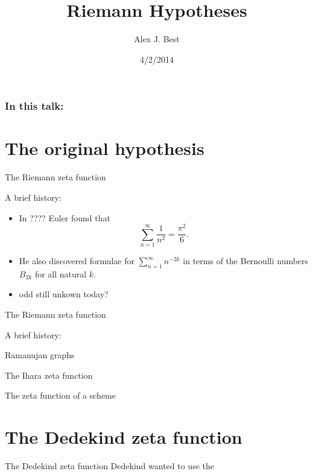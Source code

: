 \documentclass{beamer}
\author{Alex J. Best}
\institute{WMS Talks}
\date{4/2/2014}
\title{Riemann Hypotheses}
\begin{document}
\frame{\titlepage}

\begin{frame}
\frametitle{In this talk:}
\tableofcontents
\end{frame}

\section{The original hypothesis}
\begin{frame}{The Riemann zeta function}
\begin{block}{A brief history:}
\begin{itemize}
\pause \item In ???? Euler found that
\[\sum_{n=1}^{\infty} \frac{1}{n^2} = \frac{\pi^2}{6}.\]
\pause \item He also discovered formulae for $\sum_{n=1}^{\infty} n^{-2k}$ in terms of the Bernoulli numbers $B_{2k}$ for all natural $k$.

\pause \item odd still unkown today?

\end{itemize}
\end{block}
\end{frame}

\begin{frame}{The Riemann zeta function}
\begin{block}{A brief history:}
\end{block}
\end{frame}


\begin{frame}{Ramanujan graphs}
\begin{block}{}
\end{block}
\end{frame}

\begin{frame}{The Ihara zeta function}
\begin{block}{}
\end{block}
\end{frame}

\begin{frame}{The zeta function of a scheme}
\begin{block}{}
\end{block}
\end{frame}

\section{The Dedekind zeta function}
\begin{frame}{The Dedekind zeta function}
Dedekind wanted to use the 
\begin{block}{}
\end{block}
\end{frame}
\end{document}
